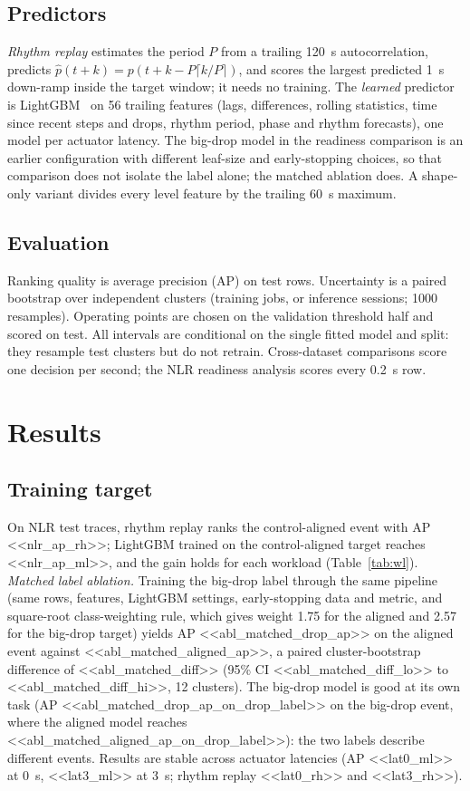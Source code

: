 \documentclass[conference]{IEEEtran}
\begin{document}
\subsection{Predictors}
\emph{Rhythm replay} estimates the period $P$ from a trailing 120~s autocorrelation, predicts
$\hat p(t+k)=p(t+k-P\lceil k/P\rceil)$, and scores the largest predicted 1~s down-ramp inside the
target window; it needs no training. The \emph{learned} predictor is LightGBM~\cite{lightgbm} on 56 trailing features
(lags, differences, rolling statistics, time since recent steps and drops, rhythm period, phase and
rhythm forecasts), one model per actuator latency. The big-drop model in the readiness comparison is an
earlier configuration with different leaf-size and early-stopping choices, so that comparison does not
isolate the label alone; the matched ablation does. A shape-only variant divides every level feature by
the trailing 60~s maximum.

\subsection{Evaluation}
Ranking quality is average precision (AP) on test rows. Uncertainty is a paired bootstrap over
independent clusters (training jobs, or inference sessions; 1000 resamples). Operating points are chosen
on the validation threshold half and scored on test. All intervals are conditional on the single fitted
model and split: they resample test clusters but do not retrain. Cross-dataset comparisons score one
decision per second; the NLR readiness analysis scores every 0.2~s row.

\section{Results}
\subsection{Training target}
On NLR test traces, rhythm replay ranks the control-aligned event with AP <<nlr_ap_rh>>; LightGBM trained
on the control-aligned target reaches <<nlr_ap_ml>>, and the gain holds for each workload (Table~\ref{tab:wl}).
\emph{Matched label ablation.} Training the big-drop label through the same pipeline (same rows, features,
LightGBM settings, early-stopping data and metric, and square-root class-weighting rule, which gives weight
1.75 for the aligned and 2.57 for the big-drop target) yields AP <<abl_matched_drop_ap>> on the aligned event
against <<abl_matched_aligned_ap>>, a paired cluster-bootstrap difference of <<abl_matched_diff>> (95\% CI
<<abl_matched_diff_lo>> to <<abl_matched_diff_hi>>, 12 clusters). The big-drop model is good at its own task
(AP <<abl_matched_drop_ap_on_drop_label>> on the big-drop event, where the aligned model reaches
<<abl_matched_aligned_ap_on_drop_label>>): the two labels describe different events.
Results are stable across actuator latencies (AP <<lat0_ml>> at 0~s, <<lat3_ml>>
at 3~s; rhythm replay <<lat0_rh>> and <<lat3_rh>>).
\end{document}
